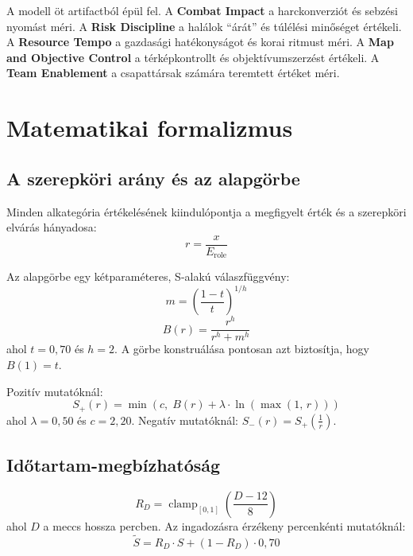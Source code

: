 A modell öt artifactból épül fel. A \textbf{Combat Impact} a harckonverziót és sebzési nyomást méri. A \textbf{Risk Discipline} a halálok ``árát'' és túlélési minőséget értékeli. A \textbf{Resource Tempo} a gazdasági hatékonyságot és korai ritmust méri. A \textbf{Map and Objective Control} a térképkontrollt és objektívumszerzést értékeli. A \textbf{Team Enablement} a csapattársak számára teremtett értéket méri.

\section{Matematikai formalizmus}

\subsection{A szerepköri arány és az alapgörbe}

Minden alkategória értékelésének kiindulópontja a megfigyelt érték és a szerepköri elvárás hányadosa:
\begin{equation}
r = \frac{x}{E_{\text{role}}}
\end{equation}

Az alapgörbe egy kétparaméteres, S-alakú válaszfüggvény:
\begin{equation}
m = \left(\frac{1-t}{t}\right)^{1/h}
\end{equation}
\begin{equation}
B(r) = \frac{r^h}{r^h + m^h}
\end{equation}
ahol $t = 0{,}70$ és $h = 2$. A görbe konstruálása pontosan azt biztosítja, hogy $B(1) = t$.

Pozitív mutatóknál:
\begin{equation}
S_+(r) = \min\!\left(c,\; B(r) + \lambda \cdot \ln\!\left(\max(1,\, r)\right)\right)
\end{equation}
ahol $\lambda = 0{,}50$ és $c = 2{,}20$. Negatív mutatóknál: $S_-(r) = S_+\!\left(\frac{1}{r}\right)$.

\subsection{Időtartam-megbízhatóság}

\begin{equation}
R_D = \operatorname{clamp}_{[0,1]}\!\left(\frac{D - 12}{8}\right)
\end{equation}
ahol $D$ a meccs hossza percben. Az ingadozásra érzékeny percenkénti mutatóknál:
\begin{equation}
\tilde{S} = R_D \cdot S + (1 - R_D) \cdot 0{,}70
\end{equation}

